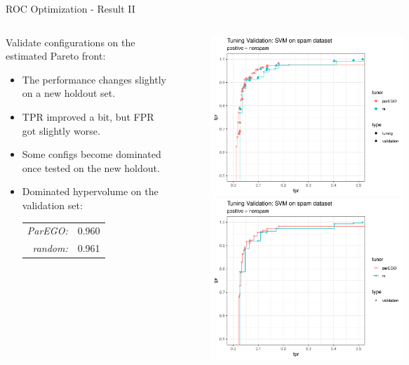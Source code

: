 \documentclass[11pt,compress,t,notes=noshow,xcolor=table]{beamer}
\begin{document}
\begin{vbframe}{ROC Optimization - Result II}

\begin{columns}
\begin{column}{0.42\textwidth}
Validate configurations on the estimated Pareto front:
\begin{itemize}
  \item The performance changes slightly on a new holdout set.
  \item TPR improved a bit, but FPR got slightly worse.
  \item Some configs become dominated once tested on the new holdout.
  \item Dominated hypervolume on the validation set:
  \begin{tabular}{rl}
    \emph{ParEGO:} & 0.960\\
    \emph{random:} & 0.961
  \end{tabular}
\end{itemize}
\end{column}
\begin{column}{0.8\textwidth}
\vspace{-0.3cm}
\begin{figure}
\includegraphics[width=0.52\textwidth]{slides/11-multicrit/figure_man/example_parego_spam_outer.png}\\
\includegraphics[width=0.52\textwidth]{slides/11-multicrit/figure_man/example_parego_spam_outer_pareto.png}
\end{figure}
\end{column}
\end{columns}

\end{vbframe}
\end{document}
